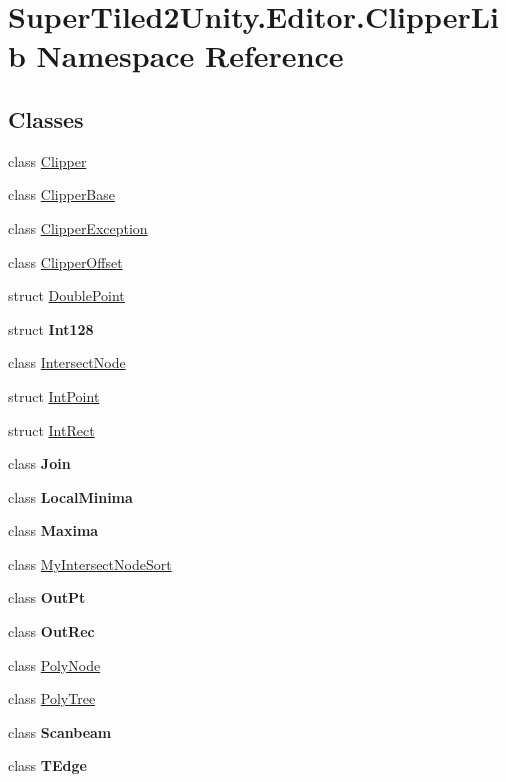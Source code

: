 \hypertarget{namespace_super_tiled2_unity_1_1_editor_1_1_clipper_lib}{}\section{Super\+Tiled2\+Unity.\+Editor.\+Clipper\+Lib Namespace Reference}
\label{namespace_super_tiled2_unity_1_1_editor_1_1_clipper_lib}
\subsection*{Classes}
\begin{DoxyCompactItemize}
\item 
class \mbox{\hyperlink{class_super_tiled2_unity_1_1_editor_1_1_clipper_lib_1_1_clipper}{Clipper}}
\item 
class \mbox{\hyperlink{class_super_tiled2_unity_1_1_editor_1_1_clipper_lib_1_1_clipper_base}{Clipper\+Base}}
\item 
class \mbox{\hyperlink{class_super_tiled2_unity_1_1_editor_1_1_clipper_lib_1_1_clipper_exception}{Clipper\+Exception}}
\item 
class \mbox{\hyperlink{class_super_tiled2_unity_1_1_editor_1_1_clipper_lib_1_1_clipper_offset}{Clipper\+Offset}}
\item 
struct \mbox{\hyperlink{struct_super_tiled2_unity_1_1_editor_1_1_clipper_lib_1_1_double_point}{Double\+Point}}
\item 
struct {\bfseries Int128}
\item 
class \mbox{\hyperlink{class_super_tiled2_unity_1_1_editor_1_1_clipper_lib_1_1_intersect_node}{Intersect\+Node}}
\item 
struct \mbox{\hyperlink{struct_super_tiled2_unity_1_1_editor_1_1_clipper_lib_1_1_int_point}{Int\+Point}}
\item 
struct \mbox{\hyperlink{struct_super_tiled2_unity_1_1_editor_1_1_clipper_lib_1_1_int_rect}{Int\+Rect}}
\item 
class {\bfseries Join}
\item 
class {\bfseries Local\+Minima}
\item 
class {\bfseries Maxima}
\item 
class \mbox{\hyperlink{class_super_tiled2_unity_1_1_editor_1_1_clipper_lib_1_1_my_intersect_node_sort}{My\+Intersect\+Node\+Sort}}
\item 
class {\bfseries Out\+Pt}
\item 
class {\bfseries Out\+Rec}
\item 
class \mbox{\hyperlink{class_super_tiled2_unity_1_1_editor_1_1_clipper_lib_1_1_poly_node}{Poly\+Node}}
\item 
class \mbox{\hyperlink{class_super_tiled2_unity_1_1_editor_1_1_clipper_lib_1_1_poly_tree}{Poly\+Tree}}
\item 
class {\bfseries Scanbeam}
\item 
class {\bfseries T\+Edge}
\end{DoxyCompactItemize}
